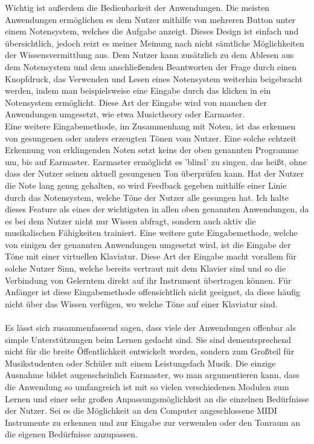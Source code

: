 Wichtig ist außerdem die Bedienbarkeit der Anwendungen. Die meisten Anwendungen ermöglichen es dem Nutzer mithilfe von mehreren Button unter einem Notensystem, welches die Aufgabe anzeigt. Dieses Design ist einfach und übersichtlich, 
jedoch reizt es meiner Meinung nach nicht sämtliche Möglichkeiten der Wissensvermittlung aus. Dem Nutzer kann zusätzlich zu dem Ablesen aus dem Notensystem und dem anschließenden Beantworten der Frage durch einen Knopfdruck, das Verwenden und Lesen eines Notensystem weiterhin beigebracht werden, 
indem man beispielsweise eine Eingabe durch das klicken in ein Notensystem ermöglicht. Diese Art der Eingabe wird von manchen der Anwendungen umgesetzt, wie etwa Musictheory oder Earmaster. \\
Eine weitere Eingabemethode, im Zusammenhang mit Noten, ist das erkennen von gesungenen oder anders erzeugten Tönen vom Nutzer. Eine solche echtzeit Erkennung von erklingenden Noten setzt keins der oben genannten Programme um, bis auf Earmaster. Earmaster ermöglicht es 'blind' zu singen, das heißt, ohne dass der Nutzer seinen aktuell gesungenen Ton überprüfen kann. Hat der Nutzer die 
Note lang genug gehalten, so wird Feedback gegeben mithilfe einer Linie durch das Notensystem, welche Töne der Nutzer alle gesungen hat. Ich halte dieses Feature als eines der wichtigsten in allen oben genannten Anwendungen, da es bei dem Nutzer nicht nur Wissen abfragt, sondern auch aktiv die musikalischen Fähigkeiten trainiert.
Eine weitere gute Eingabemethode, welche von einigen der genannten Anwendungen umgesetzt wird, ist die Eingabe der Töne mit einer virtuellen Klaviatur. Diese Art der Eingabe macht vorallem für solche Nutzer Sinn, welche bereits vertraut mit dem Klavier sind und so die Verbindung von Gelerntem direkt auf ihr Instrument übertragen können. Für 
Anfänger ist diese Eingabemethode offensichtlich nicht geeignet, da diese häufig nicht über das Wissen verfügen, wo welche Töne auf einer Klaviatur sind. \\\\
Es lässt sich zusammenfassend sagen, dass viele der Anwendungen offenbar als simple Unterstützungen beim Lernen gedacht sind. Sie sind dementsprechend nicht für die breite Öffentlichkeit entwickelt worden, sondern zum Großteil für Musikstudenten oder Schüler mit einem Leistungsfach Musik. Die einzige Ausnahme bildet augenscheinlich Earmaster, wo man argumentieren kann,
dass die Anwendung so umfangreich ist mit so vielen verschiedenen Modulen zum Lernen und einer sehr großen Anpassungsmöglichkeit an die einzelnen Bedürfnisse der Nutzer. Sei es die Möglichkeit an den Computer angeschlossene MIDI Instrumente zu erkennen und zur Eingabe zur verwenden oder
den Tonraum an die eigenen Bedürfnisse anzupassen. 


